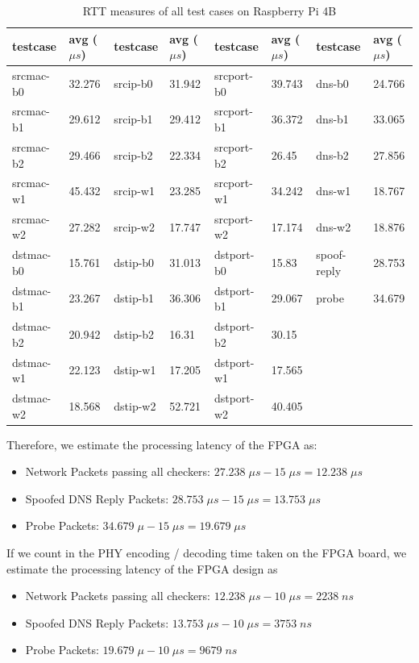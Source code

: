 \documentclass[a4paper]{report}
\begin{document}
\begin{table}[h!]
\begin{tabular}{ll|ll|ll|ll}
\hline
testcase  & avg ($\mu s$) & testcase & avg ($\mu s$) & testcase   & avg ($\mu s$) & testcase  & avg ($\mu s$) \\ \hline
srcmac-b0 & 32.276   & srcip-b0 & 31.942   & srcport-b0 & 39.743   & dns-b0      & 24.766   \\
srcmac-b1 & 29.612   & srcip-b1 & 29.412   & srcport-b1 & 36.372   & dns-b1      & 33.065   \\
srcmac-b2 & 29.466   & srcip-b2 & 22.334   & srcport-b2 & 26.45    & dns-b2      & 27.856   \\
srcmac-w1 & 45.432   & srcip-w1 & 23.285   & srcport-w1 & 34.242   & dns-w1      & 18.767   \\
srcmac-w2 & 27.282   & srcip-w2 & 17.747   & srcport-w2 & 17.174   & dns-w2      & 18.876   \\
dstmac-b0 & 15.761   & dstip-b0 & 31.013   & dstport-b0 & 15.83    & spoof-reply & 28.753   \\
dstmac-b1 & 23.267   & dstip-b1 & 36.306   & dstport-b1 & 29.067   & probe       & 34.679   \\
dstmac-b2 & 20.942   & dstip-b2 & 16.31    & dstport-b2 & 30.15    &             &          \\
dstmac-w1 & 22.123   & dstip-w1 & 17.205   & dstport-w1 & 17.565   &             &          \\
dstmac-w2 & 18.568   & dstip-w2 & 52.721   & dstport-w2 & 40.405   &             &          \\ \hline
\end{tabular}
\caption{RTT measures of all test cases on Raspberry Pi 4B}
\label{table:performance-test}
\end{table}
Therefore, we estimate the processing latency of the FPGA as:
\begin{itemize}[noitemsep]
    \item Network Packets passing all checkers: $27.238\; \mu s - 15\; \mu s = 12.238\; \mu s$
    \item Spoofed DNS Reply Packets: $28.753\; \mu s - 15\; \mu s = 13.753\; \mu s$
    \item Probe Packets: $34.679\; \mu - 15\; \mu s = 19.679\; \mu s$
\end{itemize}
If we count in the PHY encoding / decoding time taken on the FPGA board, we estimate the processing latency of the FPGA design as 
\begin{itemize}[noitemsep]
    \item Network Packets passing all checkers: $12.238\; \mu s - 10\; \mu s= 2238\; ns$
    \item Spoofed DNS Reply Packets: $13.753\; \mu s - 10\; \mu s = 3753\; ns$
    \item Probe Packets: $19.679\; \mu - 10\; \mu s = 9679\; ns$
\end{itemize}
\end{document}
